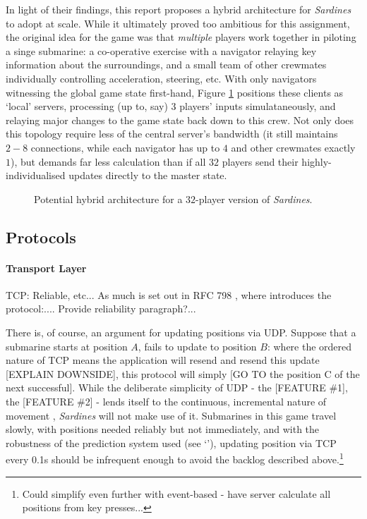\documentclass[a4paper, 10pt]{article}
\begin{document}
\begin{flushleft}
\vspace{5pt}\noindent
In light of their findings, this report proposes a hybrid architecture for \textit{Sardines} to adopt at scale. While it ultimately proved too ambitious for this assignment, the original idea for the game was that \textit{multiple} players work together in piloting a singe submarine: a co-operative exercise with a navigator relaying key information about the surroundings, and a small team of other crewmates individually controlling acceleration, steering, etc. With only navigators witnessing the global game state first-hand, Figure \ref{Hybrid Architecture} positions these clients as `local' servers, processing (up to, say) $3$ players' inputs simulataneously, and relaying major changes to the game state back down to this crew. Not only does this topology require less of the central server's bandwidth (it still maintains $2-8$ connections, while each navigator has up to $4$ and other crewmates exactly $1$),  but demands far less calculation than if all $32$ players send their highly-individualised updates directly to the master state.

\begin{figure}[h]
\centering
\caption{Potential hybrid architecture for a $32$-player version of \textit{Sardines}.}
\label{Hybrid Architecture}
\end{figure}

\subsection*{Protocols}

\paragraph{Transport Layer}

TCP: Reliable, etc...
As much is set out in RFC 798 \citeyearpar{rfc793}, where \citeauthor{rfc793} introduces the protocol:.... %
Provide reliability paragraph?...

\vspace{5pt}\noindent
There is, of course, an argument for updating positions via UDP. Suppose that a submarine starts at position $A$, fails to update to position $B$: where the ordered nature of TCP means the application will resend and resend this update [EXPLAIN DOWNSIDE], this protocol will simply [GO TO the position C of the next successful].  While the deliberate simplicity of UDP - the [FEATURE \#1], the [FEATURE \#2] - lends itself to the continuous, incremental nature of movement , \textit{Sardines} will not make use of it. Submarines in this game travel slowly, with positions needed reliably but not immediately, and with the robustness of the prediction system used (see `'), updating position via TCP every 0.1s should be infrequent enough to avoid the backlog described above.\footnote{Could simplify even further with event-based - have server calculate all positions from key presses...}


\end{flushleft}
\end{document}
